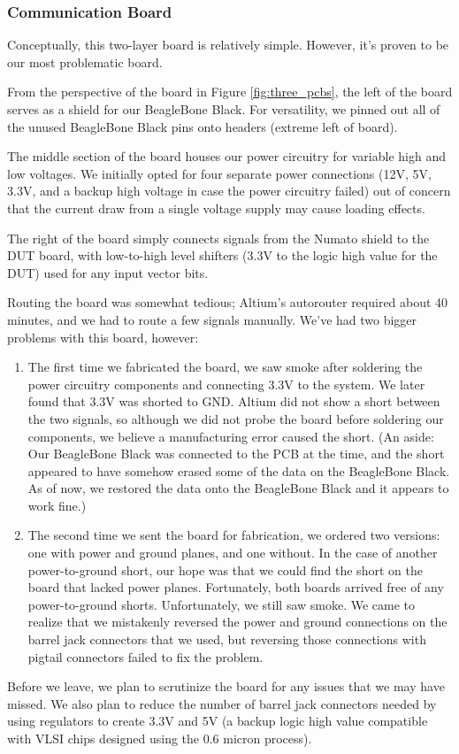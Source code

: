 \subsubsection{Communication Board}
Conceptually, this two-layer board is relatively simple. However, it's proven to be our most problematic board. 

From the perspective of the board in Figure \ref{fig:three_pcbs}, the left of the board serves as a shield for our BeagleBone Black. For versatility, we pinned out all of the unused BeagleBone Black pins onto headers (extreme left of board). 

The middle section of the board houses our power circuitry for variable high and low voltages. We initially opted for four separate power connections (12V, 5V, 3.3V, and a backup high voltage in case the power circuitry failed) out of concern that the current draw from a single voltage supply may cause loading effects. 

The right of the board simply connects signals from the Numato shield to the DUT board, with low-to-high level shifters (3.3V to the logic high value for the DUT) used for any input vector bits. 

Routing the board was somewhat tedious; Altium's autorouter required about 40 minutes, and we had to route a few signals manually. We've had two bigger problems with this board, however: 
\begin{enumerate}
	\item The first time we fabricated the board, we saw smoke after soldering the power circuitry components and connecting 3.3V to the system. We later found that 3.3V was shorted to GND. Altium did not show a short between the two signals, so although we did not probe the board before soldering our components, we believe a manufacturing error caused the short. (An aside: Our BeagleBone Black was connected to the PCB at the time, and the short appeared to have somehow erased some of the data on the BeagleBone Black. As of now, we restored the data onto the BeagleBone Black and it appears to work fine.) 
	\item The second time we sent the board for fabrication, we ordered two versions: one with power and ground planes, and one without. In the case of another power-to-ground short, our hope was that we could find the short on the board that lacked power planes. Fortunately, both boards arrived free of any power-to-ground shorts. Unfortunately, we still saw smoke. We came to realize that we mistakenly reversed the power and ground connections on the barrel jack connectors that we used, but reversing those connections with pigtail connectors failed to fix the problem.
\end{enumerate}

Before we leave, we plan to scrutinize the board for any issues that we may have missed. We also plan to reduce the number of barrel jack connectors needed by using regulators to create 3.3V and 5V (a backup logic high value compatible with VLSI chips designed using the 0.6 micron process).

\newpage